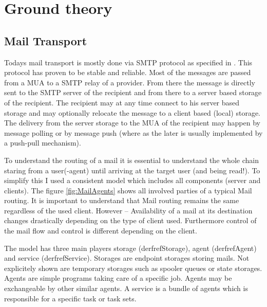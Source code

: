 \chapter{Ground theory}
\section{Mail Transport\label{sec:mailTransport}}
Todays mail transport is mostly done via SMTP protocol as specified in \cite{RFC5321}. This protocol has proven to be stable and reliable. Most of the messages are passed from a MUA to a SMTP relay of a provider. From there the message is directly sent to the SMTP server of the recipient and from there to a server based storage of the recipient. The recipient may at any time connect to his server based storage and may optionally relocate the message to a client based (local) storage. The delivery from the server storage to the MUA of the recipient may happen by message polling or by message push (where as the later is usually implemented by a push-pull mechanism).\par

To understand the routing of a mail it is essential to understand the whole chain staring from a user(-agent) until arriving at the target user (and being read!). To simplify this I used a consistent model which includes all components (server and clients). The figure \ref{fig:MailAgents} shows all involved parties of a typical Mail routing. It is important to understand that Mail routing remains the same regardless of the used client. However -- Availability of a mail at its destination changes drastically depending on the type of client used. Furthermore control of the mail flow and control is different depending on the client.\par

The model has three main players storage (derfref{Storage}), agent (derfref{Agent}) and service (derfref{Service}). Storages are endpoint storages storing mails. Not explicitely shown are temporary storages such as spooler queues or state storages. Agents are simple programs taking care of a specific job. Agents may be exchangeable by other similar agents. A service is a bundle of agents which is responsible for a specific task or task sets.

